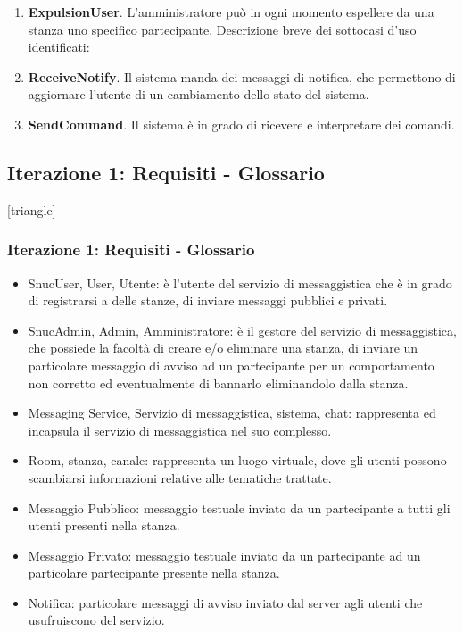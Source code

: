 \begin{frame} [allowframebreaks]
\begin{enumerate}
    \item \textbf{ExpulsionUser}. L’amministratore può in ogni momento espellere da una stanza uno specifico partecipante.  
    \newline
    Descrizione breve dei sottocasi d'uso identificati:  
    \item \textbf{ReceiveNotify}. Il sistema manda dei messaggi di notifica, che permettono di aggiornare l’utente di un cambiamento dello stato del sistema.
    \item \textbf{SendCommand}. Il sistema è in grado di ricevere e interpretare dei comandi.
   \end{enumerate}
\end{frame}

\subsection{Iterazione 1: Requisiti - Glossario}
[triangle]
\begin{frame} [allowframebreaks]
  \frametitle{Iterazione 1: Requisiti - Glossario} 
   \begin{itemize} 
    \item SnucUser, User, Utente: è l'utente del servizio di messaggistica che è in grado di registrarsi a delle stanze, di inviare messaggi pubblici e privati.
    \item SnucAdmin, Admin, Amministratore: è il gestore del servizio di messaggistica, che possiede la facoltà di creare e/o eliminare una stanza, di inviare un 
          particolare messaggio di avviso ad un partecipante per un comportamento non corretto ed eventualmente di bannarlo eliminandolo dalla stanza.
    \item Messaging Service, Servizio di messaggistica, sistema, chat: rappresenta ed incapsula il servizio di messaggistica nel suo complesso.
    \item Room, stanza, canale: rappresenta un luogo virtuale, dove gli utenti possono scambiarsi informazioni relative alle tematiche trattate.
    \item Messaggio Pubblico: messaggio testuale inviato da un partecipante a tutti gli utenti presenti nella stanza.
    \item Messaggio Privato: messaggio testuale inviato da un partecipante ad un particolare partecipante presente nella stanza.
    \item Notifica: particolare messaggi di avviso inviato dal server agli utenti che usufruiscono del servizio.  
  \end{itemize}
\end{frame}


